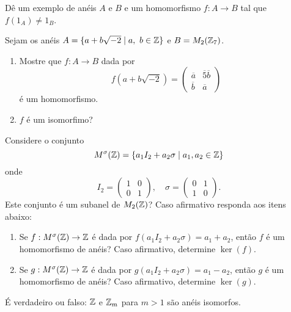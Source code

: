 \documentclass[12pt]{exam}
\begin{document}
    \vspace{.3cm}

    \questao{} D{\^e} um exemplo de an{\'e}is $A$ e $B$ e um homomorfismo $f : A \to B$ tal que $f(1_A) \ne 1_B$.

    \vspace{.3cm}

    \questao{} Sejam os an{\'e}is $A = \{ a + b\sqrt{-2} \mid a,\ b \in \mathbb{Z}\}$ e $B = M_2(\mathbb{Z}_7)$.
    \begin{enumerate}[label=({\alph*})]
        \item Mostre que $f : A \to B$ dada por
        \[
        f(a + b\sqrt{-2}) =
        \begin{pmatrix}
        \overline{a} & \overline{5}\overline{b}\\
        \overline{b} & \overline{a}
        \end{pmatrix}
        \]
        {\'e} um homomorfismo.

        \item $f$ {\'e} um isomorfimo?
    \end{enumerate}

    \vspace{.3cm}

    \questao{} Considere o conjunto
    \[
        M^\sigma(\mathbb{Z}) = \{a_1I_2 + a_2\sigma \mid a_1, a_2 \in \mathbb{Z}\}
    \]
    onde
    \[
        I_2 = \begin{pmatrix} 1 & 0\\ 0 & 1\end{pmatrix}, \quad \sigma = \begin{pmatrix} 0 & 1\\ 1 & 0\end{pmatrix}.
    \]
    Este conjunto é um subanel de $M_2(\mathbb{Z})$? Caso afirmativo responda aos itens abaixo:
    \begin{enumerate}[label=({\alph*})]
        \item Se $f : M^\sigma(\mathbb{Z}) \to \mathbb{Z}$ é dada por $f(a_1I_2 + a_2\sigma) = a_1 + a_2$, então $f$ é um homomorfismo de anéis? Caso afirmativo, determine $\ker(f)$.

        \item Se $g : M^\sigma(\mathbb{Z}) \to \mathbb{Z}$ é dada por $g(a_1I_2 + a_2\sigma) = a_1 - a_2$, então $g$ é um homomorfismo de anéis? Caso afirmativo, determine $\ker(g)$.
    \end{enumerate}

    \vspace{.3cm}

    \questao{} {\'E} verdadeiro ou falso: $\mathbb{Z}$ e $\mathbb{Z}_{m}$ para $m > 1$ s{\~a}o an{\'e}is
    isomorfos.
\end{document}
